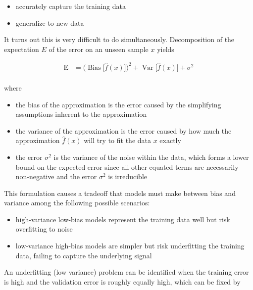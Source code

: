 \begin{itemize}
    \item accurately capture the training data
    \item generalize to new data
\end{itemize}

It turns out this is very difficult to do simultaneously. Decomposition of the expectation $E$ of the error on an unseen sample $x$ yields

\begin{equation}
{\displaystyle {\begin{aligned}\operatorname {E} &={\Big (}\operatorname {Bias} {\big [}{\hat {f}}(x){\big ]}{\Big )}^{2}+\operatorname {Var} {\big [}{\hat {f}}(x){\big ]}+\sigma ^{2}\\\end{aligned}}}
\end{equation}

where

\begin{itemize}
    \item the bias of the approximation is the error caused by the simplifying assumptions inherent to the approximation
    \item the variance of the approximation is the error caused by how much the approximation $\hat{f}(x)$ will try to fit the data $x$ exactly
    \item the error $\sigma^2$ is the variance of the noise within the data, which forms a lower bound on the expected error since all other equated terms are necessarily non-negative and the error $\sigma^2$ is irreducible
\end{itemize}

This formulation causes a tradeoff that models must make between bias and variance among the following possible scenarios:

\begin{itemize}
    \item high-variance low-bias models represent the training data well but risk overfitting to noise
    \item low-variance high-bias models are simpler but risk underfitting the training data, failing to capture the underlying signal
\end{itemize}

An underfitting (low variance) problem can be identified when the training error is high and the validation error is roughly equally high, which can be fixed by

